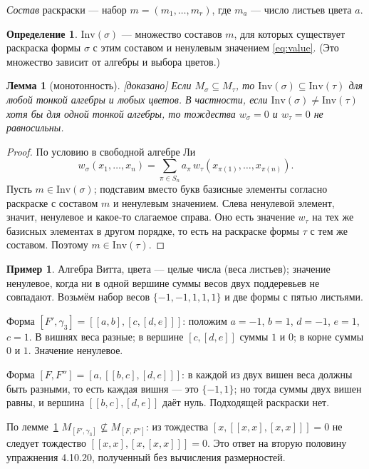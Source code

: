 \documentclass[11pt]{article}
\newcommand{\Inv}{\mathrm{Inv}}
\newcommand{\g}{\gamma}
\newcommand{\stat}[1]{\textsf{\small[#1]}}
\newcommand{\proved}{\stat{доказано}}
\theoremstyle{plain}
\newtheorem{lemma}[theorem]{Лемма}
\theoremstyle{definition}
\newtheorem{definition}[theorem]{Определение}
\newtheorem{example}[theorem]{Пример}
\theoremstyle{remark}
\begin{document}
\emph{Состав} раскраски --- набор $m=(m_1,\dots,m_r)$, где $m_a$ --- число листьев цвета $a$.

\begin{definition}
$\Inv(\sigma)$ --- множество составов $m$, для которых существует раскраска формы $\sigma$ с этим составом и ненулевым значением \eqref{eq:value}. (Это множество зависит от алгебры и выбора цветов.)
\end{definition}

\begin{lemma}[монотонность]\label{lem:mono} \proved{}
Если $M_\sigma\subseteq M_\tau$, то $\Inv(\sigma)\subseteq\Inv(\tau)$ для любой тонкой алгебры и любых цветов. В частности, если $\Inv(\sigma)\ne\Inv(\tau)$ хотя бы для одной тонкой алгебры, то тождества $w_\sigma=0$ и $w_\tau=0$ не равносильны.
\end{lemma}
\begin{proof}
По условию в свободной алгебре Ли
\[ w_\sigma(x_1,\dots,x_n)=\sum_{\pi\in S_n} a_\pi\,w_\tau(x_{\pi(1)},\dots,x_{\pi(n)}). \]
Пусть $m\in\Inv(\sigma)$; подставим вместо букв базисные элементы согласно раскраске с составом $m$ и ненулевым значением. Слева ненулевой элемент, значит, ненулевое и какое-то слагаемое справа. Оно есть значение $w_\tau$ на тех же базисных элементах в другом порядке, то есть на раскраске формы $\tau$ с тем же составом. Поэтому $m\in\Inv(\tau)$.
\end{proof}

\begin{example}\label{ex:witt5}
Алгебра Витта, цвета --- целые числа (веса листьев); значение ненулевое, когда ни в одной вершине суммы весов двух поддеревьев не совпадают. Возьмём набор весов $\{-1,-1,1,1,1\}$ и две формы с пятью листьями.

Форма $[F',\g_3]=[[a,b],[c,[d,e]]]$: положим $a=-1$, $b=1$, $d=-1$, $e=1$, $c=1$. В вишнях веса разные; в вершине $[c,[d,e]]$ суммы $1$ и $0$; в корне суммы $0$ и $1$. Значение ненулевое.

Форма $[F,F'']=[a,[[b,c],[d,e]]]$: в каждой из двух вишен веса должны быть разными, то есть каждая вишня --- это $\{-1,1\}$; но тогда суммы двух вишен равны, и вершина $[[b,c],[d,e]]$ даёт нуль. Подходящей раскраски нет.

По лемме~\ref{lem:mono} $M_{[F',\g_3]}\not\subseteq M_{[F,F'']}$: из тождества $[x,[[x,x],[x,x]]]=0$ не следует тождество $[[x,x],[x,[x,x]]]=0$. Это ответ на вторую половину упражнения 4.10.20, полученный без вычисления размерностей.
\end{example}
\end{document}
